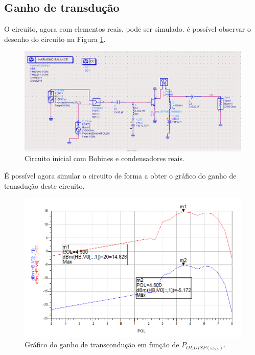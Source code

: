 \documentclass[11pt]{article}
\numberwithin{equation}{section}
\begin{document}
\subsection{Ganho de transdução}

O circuito, agora com elementos reais, pode ser simulado. é possível observar o desenho do circuito na Figura \ref{fig:Circuito_0}.

\begin{figure}[H]
	\centering
	\includegraphics[keepaspectratio=true, scale=0.45]{exps/Circuito_2c}
	\vspace{-0.5em}
	\caption{Circuito inicial com Bobines e condensadores reais.}
	\vspace{-0.8em}
	\label{fig:Circuito_0}
\end{figure}

É possível agora simular o circuito de forma a obter o gráfico do ganho de transdução deste circuito.

\begin{figure}[H]
	\centering
	\includegraphics[keepaspectratio=true, scale=0.45]{exps/GT_0}
	\vspace{-0.5em}
	\caption{Gráfico do ganho de transcondução em função de $ P_{OLDISP(\omega_{OL})} $.}
	\vspace{-0.8em}
	\label{fig:GT_0}
\end{figure}
\end{document}
